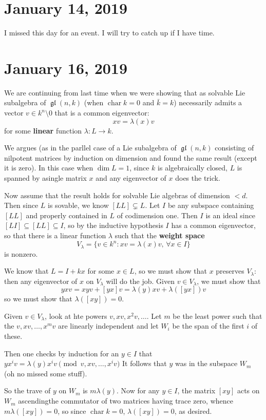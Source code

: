 \documentclass[12pt]{article}
\theoremstyle{nonumberbreak}
\theoremstyle{changebreak}
\theoremstyle{nonumberbreak}
\theoremstyle{change}
\DeclareMathOperator{\ch}{char}
\DeclareMathOperator{\gl}{\mathfrak{gl}}
\begin{document}
\section{January 14, 2019}
I missed this day for an event. I will try to catch up if I have time.

\section{January 16, 2019}
We are continuing from last time when we were showing that as solvable Lie subalgebra of $\gl(n,k)$
(when $\ch k=0$ and $\bar k=k$) necessarily admits a vector $v\in k^n\setminus 0$ that is
a common eigenvector:
\[xv=\lambda(x)v\]
for some \textbf{linear} function $\lambda:L\to k$.

We argues (as in the parllel case of a Lie subalgebra of $\gl(n,k)$ consisting of nilpotent matrices
by induction on dimension and found the same result (except it is zero). In this case when $\dim L=1$,
since $k$ is algebraically closed, $L$ is spanned by asingle matrix $x$ and any eigenvector of $x$ does the trick.

Now assume that the result holds for solvable Lie algebras of dimension $<d$. Then since $L$ is sovable, we know
$[LL]\subsetneq L$. Let $I$ be any subspace containing $[LL]$ and properly contained in $L$ of codimension one.
Then $I$ is an ideal since $[LI]\subseteq[LL]\subseteq I$, so by the inductive hypothesis $I$ has a common eigenvector, 
so that there is a linear function $\lambda$ such that the \textbf{weight space}
\[V_\lambda=\{v\in k^n:xv=\lambda(x)v,\,\forall x\in I\}\]
is nonzero.

We know that $L=I+kx$ for some $x\in L$, so we must show that $x$ preserves $V_\lambda$: then any eigenvector
of $x$ on $V_\lambda$ will do the job. Given $v\in V_\lambda$, we must show that 
\[yxv=xyv+[yx]v=\lambda(y)xv+\lambda([yx])v\]
so we must show that $\lambda([xy])=0$.

Given $v\in V_\lambda$, look at hte powers $v,xv, x^2v,\dots$. Let $m$ be the least power such that the
$v,xv,\dots,x^mv$ are linearly independent and let $W_i$ be the span of the first $i$ of these.

Then one checks by induction for an $y\in I$ that $yx^iv=\lambda(y)x^iv\pmod{v,xv,\dots,x^iv}$
It follows that $y$ was in the subspace $W_m$ (oh no missed some stuff).

So the trave of $y$ on $W_m$ is $m\lambda(y)$. Now for any $y\in I$, the matrix $[xy]$ acts on $W_m$ ascendingthe commutator of two matrices having trace zero, whence $m\lambda([xy])=0$,
so since $\ch k=0$, $\lambda([xy])=0$, as desired.
\end{document}
